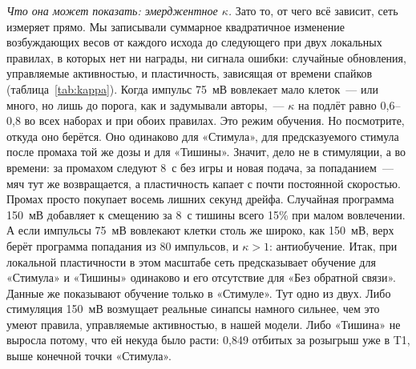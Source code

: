 \documentclass[pre,twocolumn,superscriptaddress,showpacs=false,amsmath,amssymb,nofootinbib]{revtex4-2}
\begin{document}
\emph{Что она может показать: эмерджентное $\kappa$.} Зато то, от чего всё зависит, сеть измеряет прямо. Мы записывали суммарное квадратичное изменение возбуждающих весов от каждого исхода до следующего при двух локальных правилах, в которых нет ни награды, ни сигнала ошибки: случайные обновления, управляемые активностью, и пластичность, зависящая от времени спайков (таблица~\ref{tab:kappa}). Когда импульс 75~мВ вовлекает мало клеток~--- или много, но лишь до порога, как и задумывали авторы,~--- $\kappa$ на подлёт равно 0{,}6--0{,}8 во всех наборах и при обоих правилах. Это режим обучения. Но посмотрите, откуда оно берётся. Оно одинаково для «Стимула», для предсказуемого стимула после промаха той же дозы и для «Тишины». Значит, дело не в стимуляции, а во времени: за промахом следуют 8~с без игры и новая подача, за попаданием~--- мяч тут же возвращается, а пластичность капает с почти постоянной скоростью. Промах просто покупает восемь лишних секунд дрейфа. Случайная программа 150~мВ добавляет к смещению за 8~с тишины всего 15\% при малом вовлечении. А если импульсы 75~мВ вовлекают клетки столь же широко, как 150~мВ, верх берёт программа попадания из 80 импульсов, и $\kappa>1$: антиобучение. Итак, при локальной пластичности в этом масштабе сеть предсказывает обучение для «Стимула» и «Тишины» одинаково и его отсутствие для «Без обратной связи». Данные же показывают обучение только в «Стимуле». Тут одно из двух. Либо стимуляция 150~мВ возмущает реальные синапсы намного сильнее, чем это умеют правила, управляемые активностью, в нашей модели. Либо «Тишина» не выросла потому, что ей некуда было расти: 0{,}849 отбитых за розыгрыш уже в T1, выше конечной точки «Стимула».
\end{document}
